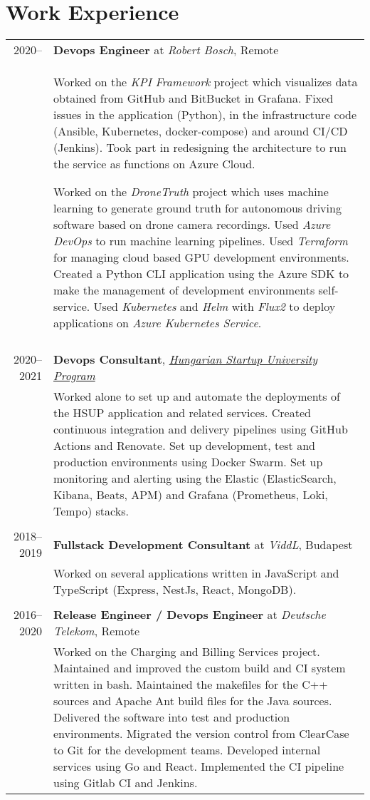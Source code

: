 \documentclass[a4paper,10pt]{article} %
\begin{document}
\section{Work Experience}
\begin{tabular}{r|p{12.5cm}}

\textsc{2020--} & \textbf{Devops Engineer} at \emph{Robert Bosch}, Remote \\
& \footnotesize{Worked on the \emph{KPI Framework} project which visualizes data obtained from GitHub and BitBucket in Grafana. Fixed issues in the application (Python), in the infrastructure code (Ansible, Kubernetes, docker-compose) and around CI/CD (Jenkins). Took part in redesigning the architecture to run the service as functions on Azure Cloud. 

Worked on the \emph{DroneTruth} project which uses machine learning to generate ground truth for autonomous driving software based on drone camera recordings. Used \emph{Azure DevOps} to run machine learning pipelines. Used \emph{Terraform} for managing cloud based GPU development environments. Created a Python CLI application using the Azure SDK to make the management of development environments self-service. Used \emph{Kubernetes} and \emph{Helm} with \emph{Flux2} to deploy applications on \emph{Azure Kubernetes Service}.
}\\

\multicolumn{2}{c}{} \\
\textsc{2020--2021} & \textbf{Devops Consultant}, \href{https://hsup.nkfih.gov.hu}{\emph{Hungarian Startup University Program}} \\
& \footnotesize{Worked alone to set up and automate the deployments of the HSUP application and related services. Created continuous integration and delivery pipelines using GitHub Actions and Renovate. Set up development, test and production environments using Docker Swarm. Set up monitoring and alerting using the Elastic (ElasticSearch, Kibana, Beats, APM) and Grafana (Prometheus, Loki, Tempo) stacks.}\\

\multicolumn{2}{c}{} \\
\textsc{2018--2019} & \textbf{Fullstack Development Consultant} at \emph{ViddL}, Budapest \\
& \footnotesize{Worked on several applications written in JavaScript and TypeScript (Express, NestJs, React, MongoDB).}\\

\multicolumn{2}{c}{} \\
\textsc{2016--2020} & \textbf{Release Engineer / Devops Engineer} at \emph{Deutsche Telekom}, Remote \\
& \footnotesize{Worked on the Charging and Billing Services project. Maintained and improved the custom build and CI system written in bash. Maintained the makefiles for the C++ sources and Apache Ant build files for the Java sources. Delivered the software into test and production environments. Migrated the version control from ClearCase to Git for the development teams}. Developed internal services using Go and React. Implemented the CI pipeline using Gitlab CI and Jenkins.\\


\end{tabular}
\end{document}
